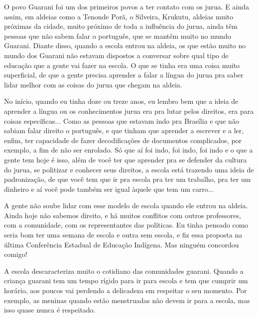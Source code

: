 \documentclass{article}
\begin{document}
O povo Guarani foi um dos primeiros povos a ter contato com os jurua. E
ainda assim, em aldeias como a Tenonde Por\~a, o Silveira, Krukutu,
aldeias muito pr\'oximas da cidade, muito pr\'oximo de toda a
influ\^encia do jurua, ainda t\^em pessoas que n\~ao sabem falar o
portugu\^es, que se mant\^em muito no mundo Guarani. Diante disso,
quando a escola entrou na aldeia, os que est\~ao muito no mundo dos
Guarani n\~ao estavam dispostos a conversar sobre qual tipo de
educa\c{c}\~ao que a gente vai fazer na escola. O que se tinha era uma
coisa muito superficial, de que a gente precisa aprender a falar a
l\'ingua do jurua pra saber lidar melhor com as coisas do jurua que
chegam na aldeia. 

No in\'icio, quando eu tinha doze ou treze anos, eu lembro bem que a
ideia de aprender a l\'ingua ou os conhecimentos jurua era pra lutar
pelos direitos, era para coisas espec\'ificas... Como as pessoas que
estavam indo pra Bras\'ilia e que n\~ao sabiam falar direito o
portugu\^es, e que tinham que aprender a escrever e a ler, enfim, ter
capacidade de fazer decodifica\c{c}\~oes de documentos complicados, por
exemplo, a fim de n\~ao ser enrolado. S\'o que a\'i foi indo, foi indo,
foi indo e o que a gente tem hoje \'e isso, al\'em de voc\^e ter que
aprender pra se defender da cultura do jurua, se politizar e conhecer
seus direitos, a escola est\'a trazendo uma ideia de
padroniza\c{c}\~ao, de que voc\^e tem que ir pra escola pra ter um
trabalho, pra ter um dinheiro e a\'i voc\^e pode tamb\'em ser igual
\`aquele que tem um carro...

A gente n\~ao soube lidar com esse modelo de escola quando ele entrou na
aldeia. Ainda hoje n\~ao sabemos direito, e h\'a muitos conflitos com
outros professores, com a comunidade, com os representantes das
pol\'iticas. Eu tinha pensado como seria bom ter uma semana de escola e
outra sem escola, e fiz essa proposta na \'ultima Confer\^encia
Estadual de Educa\c{c}\~ao Ind\'igena. Mas ningu\'em concordou comigo!

A escola descaracteriza muito o cotidiano das comunidades guarani.
Quando a crian\c{c}a guarani tem um tempo r\'igido para ir para escola
e tem que cumprir um hor\'ario, aos poucos vai perdendo a delicadeza em
respeitar o seu momento. Por exemplo, as meninas quando est\~ao
menstruadas n\~ao devem ir para a escola, mas isso quase nunca \'e
respeitado.
\end{document}
